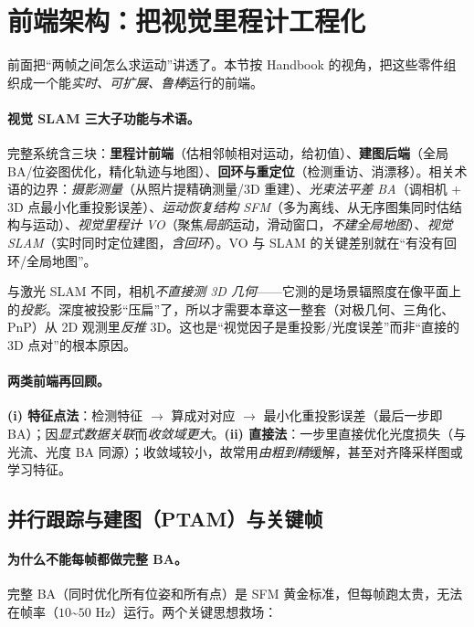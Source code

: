 \section{前端架构：把视觉里程计工程化}
\label{sec:vo-frontend}

前面把“两帧之间怎么求运动”讲透了。本节按 Handbook\cite{carlone2026handbook} 的视角，把这些零件组织成一个能\emph{实时、可扩展、鲁棒}运行的前端。

\paragraph{视觉 SLAM 三大子功能与术语\cite{carlone2026handbook}。}完整系统含三块：\textbf{里程计前端}（估相邻帧相对运动，给初值）、\textbf{建图后端}（全局 BA/位姿图优化，精化轨迹与地图）、\textbf{回环与重定位}（检测重访、消漂移）。相关术语的边界：\emph{摄影测量}（从照片提精确测量/3D 重建）、\emph{光束法平差 BA}（调相机 + 3D 点最小化重投影误差）、\emph{运动恢复结构 SFM}（多为离线、从无序图集同时估结构与运动）、\emph{视觉里程计 VO}（聚焦\emph{局部}运动，滑动窗口，\emph{不建全局地图}）、\emph{视觉 SLAM}（实时同时定位建图，\emph{含回环}）。VO 与 SLAM 的关键差别就在“有没有回环/全局地图”。

\begin{insight}
与激光 SLAM 不同，相机\emph{不直接测 3D 几何}——它测的是场景辐照度在像平面上的\emph{投影}\cite{carlone2026handbook}。深度被投影“压扁”了，所以才需要本章这一整套（对极几何、三角化、PnP）从 2D 观测里\emph{反推} 3D。这也是“视觉因子是重投影/光度误差”而非“直接的 3D 点对”的根本原因。
\end{insight}

\paragraph{两类前端再回顾\cite{carlone2026handbook}。}\textbf{(i) 特征点法}：检测特征 $\to$ 算成对对应 $\to$ 最小化重投影误差（最后一步即 BA）；因\emph{显式数据关联}而\emph{收敛域更大}。\textbf{(ii) 直接法}：一步里直接优化光度损失（与光流、光度 BA 同源）；收敛域较小，故常用\emph{由粗到精}缓解，甚至对齐降采样图或学习特征。

\subsection{并行跟踪与建图（PTAM）与关键帧}
\label{sec:vo-ptam}

\paragraph{为什么不能每帧都做完整 BA。}完整 BA（同时优化所有位姿和所有点）是 SFM 黄金标准，但每帧跑太贵，无法在帧率（$10$\textasciitilde$50$ Hz）运行\cite{carlone2026handbook}。两个关键思想救场：

